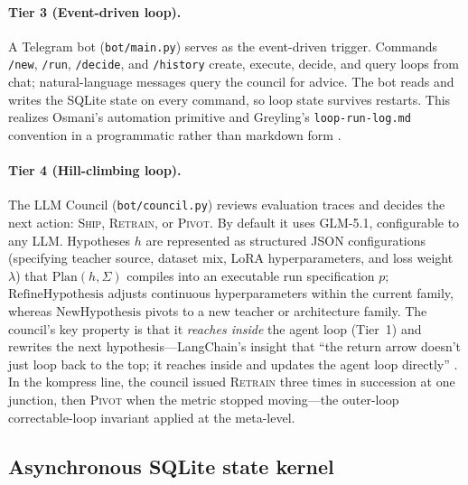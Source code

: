 \paragraph{Tier 3 (Event-driven loop).} A Telegram bot
(\texttt{bot/main.py}) serves as the event-driven trigger. Commands
\texttt{/new}, \texttt{/run}, \texttt{/decide}, and \texttt{/history}
create, execute, decide, and query loops from chat; natural-language
messages query the council for advice. The bot reads and writes the SQLite
state on every command, so loop state survives restarts. This realizes
Osmani's automation primitive and Greyling's \texttt{loop-run-log.md}
convention in a programmatic rather than markdown form
\citep{greyling2026loop}.

\paragraph{Tier 4 (Hill-climbing loop).} The LLM Council
(\texttt{bot/council.py}) reviews evaluation traces and decides the next
action: \textsc{Ship}, \textsc{Retrain}, or \textsc{Pivot}. By default it
uses GLM-5.1, configurable to any LLM. Hypotheses $h$ are represented as
structured JSON configurations (specifying teacher source, dataset mix, LoRA
hyperparameters, and loss weight $\lambda$) that $\mathrm{Plan}(h,\Sigma)$
compiles into an executable run specification $p$; $\mathrm{RefineHypothesis}$
adjusts continuous hyperparameters within the current family, whereas
$\mathrm{NewHypothesis}$ pivots to a new teacher or architecture family. The
council's key property is that
it \emph{reaches inside} the agent loop (Tier~1) and rewrites the next
hypothesis---LangChain's insight that ``the return arrow doesn't just loop
back to the top; it reaches inside and updates the agent loop directly''
\citep{langchain2026loops}. In the kompress line, the council issued
\textsc{Retrain} three times in succession at one junction, then
\textsc{Pivot} when the metric stopped moving---the outer-loop
correctable-loop invariant applied at the meta-level.

\subsection{Asynchronous SQLite state kernel}
\label{sec:loopkit:sqlite}

